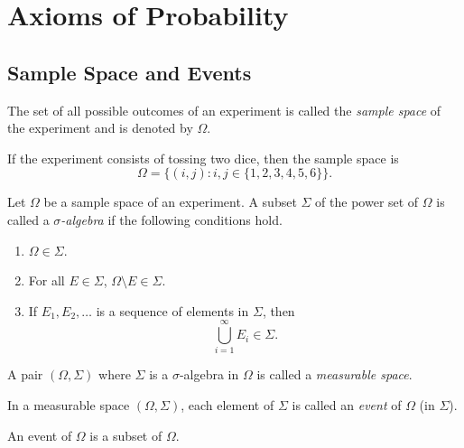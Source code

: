 \chapter{Axioms of Probability}
\section{Sample Space and Events}
\begin{definition}
  The set of all possible outcomes of an experiment is called the
  \emph{sample space} of the experiment and is denoted by $\Omega$.
\end{definition}
\begin{example}
  If the experiment consists of tossing two dice, then the sample space is
  \begin{equation*}
    \Omega = \{ (i, j): i, j \in \{1, 2, 3, 4, 5, 6\} \}.
  \end{equation*}
\end{example}

\begin{definition}
  Let $\Omega$ be a sample space of an experiment.
  A subset $\Sigma$ of the power set of $\Omega$ is called a
  \emph{$\sigma$-algebra} if the following conditions hold.
  \begin{enumerate}
    \item $\Omega \in \Sigma$.
    \item For all $E \in \Sigma$,
      $\Omega \setminus E \in \Sigma$.
    \item If $E_1, E_2, \dots$ is a sequence of elements in $\Sigma$, then
      \begin{equation*}
        \bigcup_{i=1}^\infty E_i \in \Sigma.
      \end{equation*}
  \end{enumerate}
\end{definition}

\begin{definition}
  A pair $(\Omega, \Sigma)$ where $\Sigma$ is a $\sigma$-algebra in $\Omega$
  is called a \emph{measurable space}.
\end{definition}

\begin{definition}
  In a measurable space $(\Omega, \Sigma)$, each element of $\Sigma$ is called
  an \emph{event} of $\Omega$ (in $\Sigma$).
\end{definition}
\begin{remark}
  An event of $\Omega$ is a subset of $\Omega$.
\end{remark}

